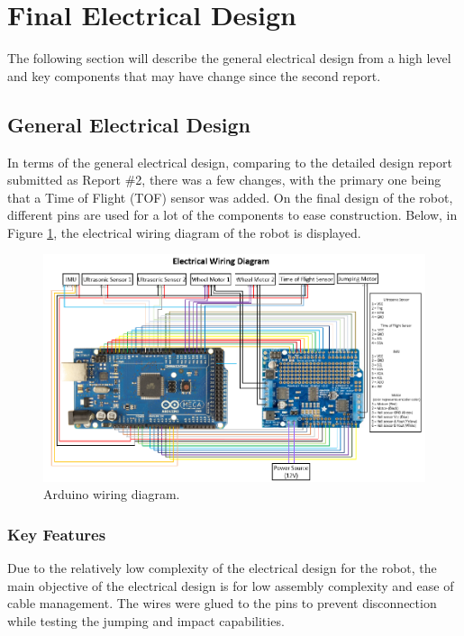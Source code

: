\documentclass[ece]{uw-wkrpt}
\let\oldsection\section
\renewcommand\section{\clearpage\oldsection}
\begin{document}
\section{Final Electrical Design} \label{electrical}

The following section will describe the general electrical design from a high level and key components that may have change since the second report. 

\subsection{General Electrical Design}

In terms of the general electrical design, comparing to the detailed design report submitted as Report \#2, there was a few changes, with the primary one being that a Time of Flight (TOF) sensor was added. On the final design of the robot, different pins are used for a lot of the components to ease construction. Below, in Figure \ref{fig:wiring}, the electrical wiring diagram of the robot is displayed. 

\begin{figure}
    \centering
    \includegraphics[width=5.5in]{res/wiringDiagram}
    \caption[Arduino wiring diagram]
          {Arduino wiring diagram.}
    \label{fig:wiring}
\end{figure}

\subsubsection{Key Features}

Due to the relatively low complexity of the electrical design for the robot, the main objective of the electrical design is for low assembly complexity and ease of cable management. The wires were glued to the pins to prevent disconnection while testing the jumping and impact capabilities.
\end{document}
